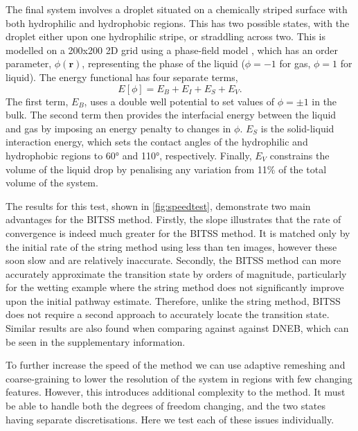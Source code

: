 \documentclass[aps,twocolumn]{revtex4-1}
\begin{document}
\topic The final system involves a droplet situated on a chemically striped surface with both hydrophilic and hydrophobic regions.
This has two possible states, with the droplet either upon one hydrophilic stripe, or straddling across two.
This is modelled on a 200x200 2D grid using a phase-field model \cite{Panter2019b}, which has an order parameter, $\phi(\bm{r})$, representing the phase of the liquid ($\phi=-1$ for gas, $\phi=1$ for liquid).
The energy functional has four separate terms,
\begin{equation}
  E[\phi] = E_B + E_I + E_S + E_V.
\end{equation}
The first term, $E_B$, uses a double well potential to set values of $\phi=\pm1$ in the bulk.
The second term then provides the interfacial energy between the liquid and gas by imposing an energy penalty to changes in $\phi$.
$E_S$ is the solid-liquid interaction energy, which sets the contact angles of the hydrophilic and hydrophobic regions to 60\si{\degree} and 110\si{\degree}, respectively.
Finally, $E_V$ constrains the volume of the liquid drop by penalising any variation from 11\% of the total volume of the system.

\topic The results for this test, shown in \cref{fig:speedtest}, demonstrate two main advantages for the BITSS method.
Firstly, the slope illustrates that the rate of convergence is indeed much greater for the BITSS method.
It is matched only by the initial rate of the string method using less than ten images, however these soon slow and are relatively inaccurate.
Secondly, the BITSS method can more accurately approximate the transition state by orders of magnitude, particularly for the wetting example where the string method does not significantly improve upon the initial pathway estimate.
Therefore, unlike the string method, BITSS does not require a second approach to accurately locate the transition state.
Similar results are also found when comparing against against DNEB, which can be seen in the supplementary information.


\topic To further increase the speed of the method we can use adaptive remeshing and coarse-graining to lower the resolution of the system in regions with few changing features.
However, this introduces additional complexity to the method.
It must be able to handle both the degrees of freedom changing, and the two states having separate discretisations.
Here we test each of these issues individually.
\end{document}
